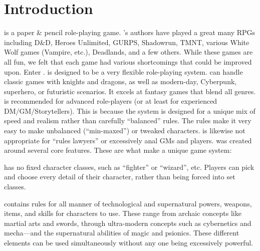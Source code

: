 \documentclass[twoside]{book}
\begin{document}
\section{Introduction}
    \APATHY{}  is a paper \& pencil role-playing game.
            \APATHY{}’s authors have played a great many RPGs
            including D\&D, Heroes Unlimited, GURPS, Shadowrun, TMNT,
            various White Wolf games (Vampire, etc.), Deadlands, and a
            few others. While these games are all fun, we felt that each
            game had various shortcomings that could be improved upon.
            Enter \APATHY{}. \APATHY{}  is designed to be a very
            flexible role-playing system. \APATHY{}  can handle classic
            games with knights and dragons, as well as modern-day,
            Cyberpunk, superhero, or futuristic scenarios. It excels at
            fantasy games that blend all genres.
          \APATHY{}  is recommended for advanced role-players (or
            at least for experienced DM/GM/Storytellers). This is because
            the \APATHY{}  system is designed for a unique mix of speed
            and realism rather than carefully “balanced”
            rules. The \APATHY{}  rules make it very easy to make
            unbalanced (“min-maxed”) or tweaked characters.
            \APATHY{}  is likewise not appropriate for “rules
            lawyers” or excessively anal GMs and players.
          \APATHY{}  was created around several core features.
            These are what make \APATHY{}  a unique game system:
            
              
               \APATHY{}  has no fixed character classes, such as
                “fighter” or “wizard”, etc.
                Players can pick and choose every detail of their
                character, rather than being forced into set classes.
                
              
              
               \APATHY{}  contains rules for all manner of
                technological and supernatural powers, weapons, items,
                and skills for characters to use. These range from
                archaic concepts like martial arts and swords, through
                ultra-modern concepts such as cybernetics and
                mecha—and the supernatural abilities of magic and
                psionics. These different elements can be used
                simultaneously without any one being excessively
                powerful.
                
\end{document}
